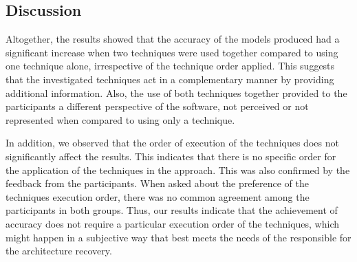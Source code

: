 {%

\subsection{Discussion}



Altogether, the results showed that the accuracy of the models produced had a significant increase when two techniques were used together compared to using one technique alone, irrespective of the technique order applied. This suggests that the investigated techniques act in a complementary manner by providing additional information. Also, the use of both techniques together provided to the participants a different perspective of the software, not perceived or not represented when compared to using only a technique. 


In addition, we observed that the order of execution of the techniques does not significantly affect the results. This indicates that there is no specific order for the application of the techniques in the approach. This was also confirmed by the feedback from the participants. When asked about the preference of the techniques execution order, there was no common agreement among the participants in both groups. Thus, our results indicate that the achievement of accuracy does not require a particular execution order of the techniques, which might happen in a subjective way that best meets the needs of the responsible for the architecture recovery.

}
